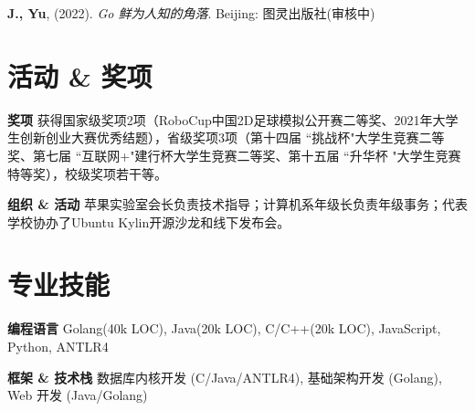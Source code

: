 \documentclass[letterpaper,10pt]{article}
\newcommand{\resumeItem}[2]{
  \item\small{
    \textbf{\:#1}{ #2 \vspace{-4pt}}
  }
}
\begin{document}
    \resumeItem{}{\textbf{J., Yu}, (2022). \textit{Go 鲜为人知的角落}. Beijing: 图灵出版社(审核中)}
    
\vspace{-5pt}
\section{活动 \& 奖项}
    
        \resumeItem{奖项}{获得国家级奖项2项（RoboCup中国2D足球模拟公开赛二等奖、2021年大学生创新创业大赛优秀结题），省级奖项3项（第十四届 ``挑战杯"大学生竞赛二等奖、第七届 ``互联网+"建行杯大学生竞赛二等奖、第十五届 ``升华杯 "大学生竞赛特等奖），校级奖项若干等。}
        \resumeItem{组织 \& 活动}{苹果实验室会长负责技术指导；计算机系年级长负责年级事务；代表学校协办了Ubuntu Kylin开源沙龙和线下发布会。}
        
\vspace{-4pt}
\section{专业技能}
  	\resumeItem
      {编程语言}
      {Golang(40k LOC), Java(20k LOC), C/C++(20k LOC), JavaScript, Python, ANTLR4}
    \resumeItem
      {框架 \& 技术栈}
      {数据库内核开发 (C/Java/ANTLR4), 基础架构开发 (Golang), Web 开发 (Java/Golang)}


\end{document}
